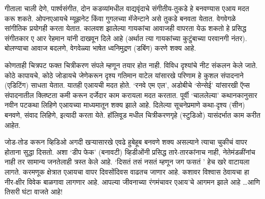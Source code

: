 गीताला चाली देणे, पार्श्वसंगीत, दोन कडव्यांमधील वाद्यवृंदाचे संगीतीय-तुकडे हे बनवण्यास एआय मदत करू शकते. ओपनएआयचे म्यूझनेट किंवा गुगलच्या मॅजेन्टाने असे तुकडे बनवता येतात. वेगवेगळे सांगीतिक प्रयोगही करता येतात. कालवश झालेल्या गायकांचा आवाजही वापरता येऊ शकतो हे प्रसिद्ध संगीतकार ए आर रेहमान यांनी दाखवून दिले आहे (अर्थात त्या गायकांच्या कुटुंबाच्या परवानगी नंतर). बोलण्याचा आवाज बदलणे, वेगवेळ्या भाषेत ध्वनिमुद्रण (डबिंग) करणे शक्य आहे. 

कोणताही चित्रपट फक्त चित्रीकरण संपले म्हणून तयार होत नाही. विविध दृश्यांचे नीट संकलन केले जाते. कोठे कापायचे, कोठे जोडायचे जेणेकरून दृश्य गतिमान वाटेल यांसारखे परिणाम हे कुशल संपादनाने (एडिटिंग) साधता येतात. यातही एआयची मदत होते. `रनवे एम एल', अडोबीचे `सेन्सेई' यांसारखी ऍप्स संपादनातील क्लिष्टता कमी करून दर्जेदार काम करायला मदत करतात.  पूर्वी `चाललेल्या' कथानकानुसार नवीन पटकथा लिहिणे एआयच्या माध्यमातून शक्य झाले आहे. दिलेल्या सूचनेप्रमाणे कथा-दृश्य (सीन) बनवणे, संवाद लिहिणे, इत्यादी करता येते. हॉलिवूड मधील चित्रीकरणगृहे (स्टुडिओ) यासंदर्भात काम करीत आहेत. 

जोड-तोड करून व्हिडिओ अगदी खऱ्यासारखे एवढे हुबेहूब बनवणे शक्य असल्याने त्याचा चुकीचं वापर होताना सुद्धा दिसतो. अशा `डीप फेक' (बनावटी) व्हिडीओंनी प्रसिद्ध तारे-तारकांनाच नाही, नेतेमंडळींनांच नाही तर सामान्य जनतेलाही त्रस्त केले आहे. `दिसतं तसं नसतं म्हणून जग फसतं ' हेच खरे वाटायला लागते. करमणूक क्षेत्रात एआयचा वापर दिवसोंदिवस वाढतच जाणार आहे. कशावर विश्वास ठेवायचा हा नीर-क्षीर विवेक बाळगावा लागणार आहे. आपल्या जीवनाच्या रंगमंचावर एआय'चे आगमन झाले आहे \ldots  आणि तिसरी घंटा वाजते आहे!